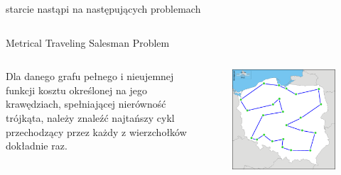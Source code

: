\documentclass[final,hyperref={pdfpagelabels=false}]{beamer}
\begin{document}
\begin{frame}
  \begin{columns}
    \begin{column}{.96\textwidth}
      \vspace{1cm}
      \begin{center}
        \veryHuge starcie nastąpi na następujących problemach
      \end{center}
      \vspace{1cm}
    \end{column}
  \end{columns}

  \begin{columns}
    \begin{column}{.46\textwidth}
      \begin{block}{Metrical Traveling Salesman Problem}
        \begin{minipage}{\linewidth}
          \begin{columns}
            \begin{column}{.38\linewidth}
              Dla danego grafu pełnego i nieujemnej funkcji kosztu określonej na jego krawędziach, spełniającej nierówność trójkąta, należy znaleźć najtańszy
              cykl przechodzący przez każdy z wierzchołków dokładnie raz.
            \end{column}

            \begin{column}{.58\linewidth}
              \begin{figure}
                \centering
                \includegraphics[width=0.8\linewidth]{poland_cities_cycle.eps}
              \end{figure}
            \end{column}


\end{columns}
\end{minipage}
\end{block}
\end{column}
\end{columns}
\end{frame}
\end{document}
